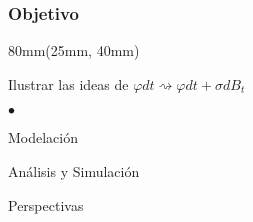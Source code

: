 \begin{frame}
    \frametitle{Objetivo}
    \begin{textblock*}{80mm}(25mm, 40mm)
            \begin{yellowbox}{%
                Ilustrar las ideas de 
                $
                    \varphi dt 
                    \rightsquigarrow 
                    \varphi dt 
                    + 
                    \sigma dB_t
                $
            }
                \begin{list}{$\bullet$}{}
                    \item
                        Modelación
                    \item
                        Análisis y Simulación 
                    \item
                        Perspectivas
                \end{list}
            \end{yellowbox}
    \end{textblock*}
\end{frame}